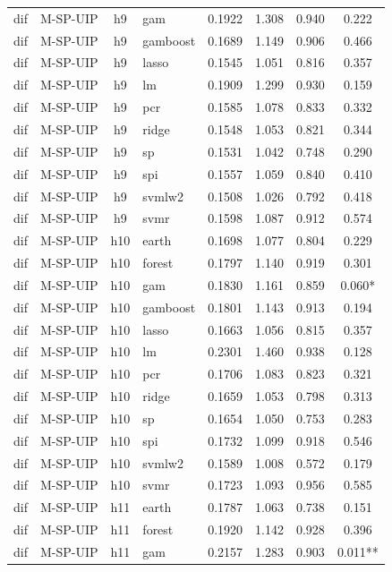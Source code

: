 \begin{ThreePartTable}
\begin{longtable}[t]{llclcccc}
dif & M-SP-UIP & h9 & gam & 0.1922 & 1.308 & 0.940 & 0.222\\
dif & M-SP-UIP & h9 & gamboost & 0.1689 & 1.149 & 0.906 & 0.466\\
dif & M-SP-UIP & h9 & lasso & 0.1545 & 1.051 & 0.816 & 0.357\\
dif & M-SP-UIP & h9 & lm & 0.1909 & 1.299 & 0.930 & 0.159\\
dif & M-SP-UIP & h9 & pcr & 0.1585 & 1.078 & 0.833 & 0.332\\
dif & M-SP-UIP & h9 & ridge & 0.1548 & 1.053 & 0.821 & 0.344\\
dif & M-SP-UIP & h9 & sp & 0.1531 & 1.042 & 0.748 & 0.290\\
dif & M-SP-UIP & h9 & spi & 0.1557 & 1.059 & 0.840 & 0.410\\
dif & M-SP-UIP & h9 & svmlw2 & 0.1508 & 1.026 & 0.792 & 0.418\\
dif & M-SP-UIP & h9 & svmr & 0.1598 & 1.087 & 0.912 & 0.574\\
\addlinespace
dif & M-SP-UIP & h10 & earth & 0.1698 & 1.077 & 0.804 & 0.229\\
dif & M-SP-UIP & h10 & forest & 0.1797 & 1.140 & 0.919 & 0.301\\
dif & M-SP-UIP & h10 & gam & 0.1830 & 1.161 & 0.859 & 0.060*\\
dif & M-SP-UIP & h10 & gamboost & 0.1801 & 1.143 & 0.913 & 0.194\\
dif & M-SP-UIP & h10 & lasso & 0.1663 & 1.056 & 0.815 & 0.357\\
dif & M-SP-UIP & h10 & lm & 0.2301 & 1.460 & 0.938 & 0.128\\
dif & M-SP-UIP & h10 & pcr & 0.1706 & 1.083 & 0.823 & 0.321\\
dif & M-SP-UIP & h10 & ridge & 0.1659 & 1.053 & 0.798 & 0.313\\
dif & M-SP-UIP & h10 & sp & 0.1654 & 1.050 & 0.753 & 0.283\\
dif & M-SP-UIP & h10 & spi & 0.1732 & 1.099 & 0.918 & 0.546\\
dif & M-SP-UIP & h10 & svmlw2 & 0.1589 & 1.008 & 0.572 & 0.179\\
dif & M-SP-UIP & h10 & svmr & 0.1723 & 1.093 & 0.956 & 0.585\\
\addlinespace
dif & M-SP-UIP & h11 & earth & 0.1787 & 1.063 & 0.738 & 0.151\\
dif & M-SP-UIP & h11 & forest & 0.1920 & 1.142 & 0.928 & 0.396\\
dif & M-SP-UIP & h11 & gam & 0.2157 & 1.283 & 0.903 & 0.011**\\

\end{longtable}
\end{ThreePartTable}
